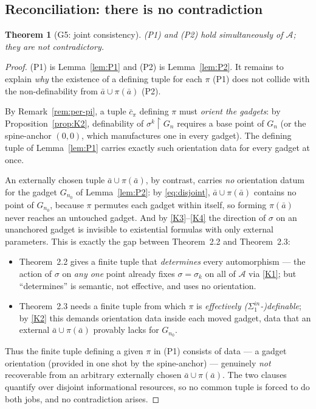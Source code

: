 \documentclass[12pt,fullpage]{article}
\newtheorem{theorem}{Theorem}[section]
\theoremstyle{definition}
\newcommand{\A}{\mathcal{A}}
\begin{document}
\subsection*{Reconciliation: there is no contradiction}

\begin{theorem}[G5: joint consistency]\label{thm:G5}
(P1) and (P2) hold simultaneously of $\A$; they are not contradictory.
\end{theorem}

\begin{proof}
(P1) is Lemma~\ref{lem:P1} and (P2) is Lemma~\ref{lem:P2}.  It remains to
explain \emph{why} the existence of a defining tuple for each $\pi$ (P1) does
not collide with the non-definability from $\bar a\cup\pi(\bar a)$ (P2).

By Remark~\ref{rem:per-pi}, a tuple $\bar c_\pi$ defining $\pi$ must
\emph{orient the gadgets}: by Proposition~\ref{prop:K2}, definability of
$\sigma^k\restriction G_n$ requires a base point of $G_n$ (or the spine-anchor
$(0,0)$, which manufactures one in every gadget).  The defining tuple of
Lemma~\ref{lem:P1} carries exactly such orientation data for every gadget at
once.

An externally chosen tuple $\bar a\cup\pi(\bar a)$, by contrast, carries
\emph{no} orientation datum for the gadget $G_{n_0}$ of Lemma~\ref{lem:P2}: by
\eqref{eq:disjoint}, $\bar a\cup\pi(\bar a)$ contains no point of $G_{n_0}$,
because $\pi$ permutes each gadget within itself, so forming $\pi(\bar a)$
never reaches an untouched gadget.  And by \ref{K3}--\ref{K4} the direction of
$\sigma$ on an unanchored gadget is invisible to existential formulas with
only external parameters.  This is exactly the gap between Theorem~2.2 and
Theorem~2.3:
\begin{itemize}
\item Theorem~2.2 gives a finite tuple that \emph{determines} every
  automorphism --- the action of $\sigma$ on \emph{any one} point already fixes
  $\sigma=\sigma_k$ on all of $\A$ via \ref{K1}; but ``determines'' is
  semantic, not effective, and uses no orientation.
\item Theorem~2.3 needs a finite tuple from which $\pi$ is \emph{effectively
  ($\Sigma^{in}_1$-)definable}; by \ref{K2} this demands orientation data
  inside each moved gadget, data that an external $\bar a\cup\pi(\bar a)$
  provably lacks for $G_{n_0}$.
\end{itemize}

Thus the finite tuple defining a given $\pi$ in (P1) consists of data --- a
gadget orientation (provided in one shot by the spine-anchor) --- genuinely
\emph{not} recoverable from an arbitrary externally chosen
$\bar a\cup\pi(\bar a)$.  The two clauses quantify over disjoint informational
resources, so no common tuple is forced to do both jobs, and no contradiction
arises.
\end{proof}
\end{document}
